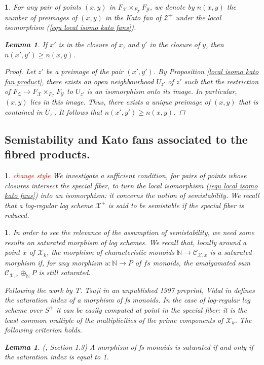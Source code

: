 \documentclass{amsart}%
\numberwithin{equation}{subsection}
\theoremstyle{plain2}
\newtheorem{lemma}[equation]{Lemma}
\theoremstyle{definition2}
\theoremstyle{stepstyle}
\theoremstyle{point}
\theoremstyle{subpoint}
\newtheorem{subpoint}[equation]{}%
\newcommand{\spa}[1]{\begin{subpoint}#1\end{subpoint}}           %
\newcommand{\N}{\ensuremath{\mathbb{N}}}
\newcommand{\cX}{\ensuremath{\mathscr{X}}}
\newcommand{\caC}{\ensuremath{\mathcal{C}}}
\newcommand{\cY}{\ensuremath{\mathscr{Y}}}
\newcommand{\cZ}{\ensuremath{\mathscr{Z}}}
\renewcommand{\cY}{\ensuremath{\mathscr{Y}}}
\begin{document}
\spa{For any pair of points $(x,y)$ in $F_\cX \times_{F_{\mathscr{T}}} F_\cY$, we denote by $n(x,y)$ the number of preimages of $(x,y)$ in the Kato fan of $\cZ^+$ under the local isomorphism (\ref{equ local isomo kato fans}).
\begin{lemma} \label{lemma number of preimages} If $x'$ is in the closure of $x$, and $y'$ in the closure of $y$, then $n(x',y')\geqslant n(x,y)$.
\end{lemma}
\begin{proof}
Let $z'$ be a preimage of the pair $(x',y')$. By Proposition \ref{local isomo kato fan product}, there exists an open neighbourhood $U_{z'}$ of $z'$ such that the restriction of $F_{\cZ} \rightarrow F_{\cX} \times_{F_\mathscr{T}} F_{\cY}$ to $U_{z'}$ is an isomorphism onto its image. In particular, $(x,y)$ lies in this image. Thus, there exists a unique preimage of $(x,y)$ that is contained in $U_{z'}$. It follows that $n(x',y')\geqslant n(x,y)$.
\end{proof}
}

\subsection{Semistability and Kato fans associated to the fibred products.} 
\spa{\textcolor{red}{change style} We investigate a sufficient condition, for pairs of points whose closures intersect the special fiber, to turn the local isomorphism (\ref{equ local isomo kato fans}) into an isomorphism: it concerns the notion of semistability. We recall that a log-regular log scheme $\cX^+$ is said to be semistable if the special fiber is reduced.}

\spa{In order to see the relevance of the assumption of semistability, we need some results on saturated morphism of log schemes. We recall that, locally around a point $x$ of $\cX_k$, the morphism of characteristic monoids $\N \rightarrow \caC_{\cX,x}$ is a saturated morphism if, for any morphism $u: \N \rightarrow P$ of $fs$ monoids, the amalgamated sum $\caC_{\cX,x} \oplus_{\N} P$ is still saturated.

Following the work by T. Tsuji in an unpublished 1997 preprint, Vidal in \cite{Vidal} defines the saturation index of a morphism of \emph{fs} monoids. In the case of log-regular log scheme over $S^+$ it can be easily computed at point in the special fiber: it is the least common multiple of the multiplicities of the prime components of $\cX_k$. The following criterion holds.
\begin{lemma} \label{lemma criterion saturation}(\cite{Vidal}, Section 1.3)
A morphism of fs monoids is saturated if and only if the saturation index is equal to 1.
\end{lemma}
}
\end{document}
